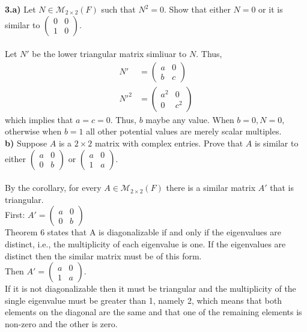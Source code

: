 \documentclass[11pt]{amsart}
\theoremstyle{definition}  %
\begin{document}
\newpage
\vskip 0.1cm
\noindent
{\bf 3.a)}  Let $N \in \mathcal{M}_{2 \times 2}(F)$ such that $N^2 = 0$. Show that either $N = 0$ or it is similar to $\left( \begin{array}{cc} 0 & 0 \\ 1 & 0 \end{array} \right)$.\\
\\
Let $N'$ be the lower triangular matrix simliuar to $N$.  Thus, 
\begin{align*}
	N' &= \left( \begin{array}{cc}
		a & 0 \\
		b & c
	\end{array}
	\right)\\
	N'^2 &= \left( \begin{array}{cc}
		a^2 & 0 \\
		0 & c^2
	\end{array}
	\right)
\end{align*}which implies that $a=c=0$.  Thus, $b$ maybe any value.  When $b=0, N=0$, otherwise when $b=1$ all other potential values are merely scalar multiples.
\\
{\bf b)}  Suppose $A$ is a $ 2 \times 2$ matrix with complex entries. Prove that $A$ is similar to either $\left( \begin{array}{cc} a & 0 \\ 0  & b \end{array} \right)$ or
$\left( \begin{array}{cc} a & 0 \\ 1 & a \end{array} \right)$.\\
\\
By the corollary, for every $A\in \mathcal{M}_{2\times 2}(F)$ there is a similar matrix $A'$ that is triangular.\\
First: $A'=\left( \begin{array}{cc} a & 0 \\ 0  & b \end{array} \right)$\\
Theorem 6 states that A is diagonalizable if and only if the eigenvalues are distinct, i.e., the multiplicity of each eigenvalue is one.  If the eigenvalues are distinct then the similar matrix must be of this form.  \\
Then $A'=\left( \begin{array}{cc} a & 0 \\ 1 & a \end{array} \right)$.\\
If it is not diagonalizable then it must be triangular and the multiplicity of the single eigenvalue must be greater than 1, namely 2, which means that both elements on the diagonal are the same and that one of the remaining elements is non-zero and the other is zero.\\
\end{document}
